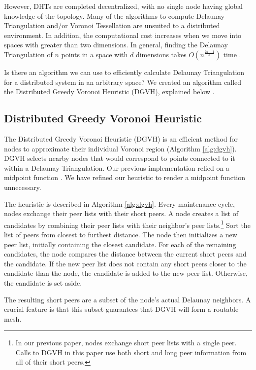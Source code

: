 \documentclass[11pt,conference]{IEEEtran}
\begin{document}
However, DHTs are completed decentralized, with no single node having global knowledge of the topology.
Many of the algorithms to compute Delaunay Triangulation and/or Voronoi Tessellation are unsuited to a distributed environment.
In addition, the computational cost increases when we move into spaces with greater than two dimensions.
In general, finding the Delaunay Triangulation of $n$ points in a space with $d$ dimensions takes $O(n^{\frac{2d-1}{d}})$ time \cite{watson1981computing}.


Is there an algorithm we can use to efficiently calculate Delaunay Triangulation for a distributed system in an arbitrary space?
We created an algorithm called the Distributed Greedy Voronoi Heuristic (DGVH), explained below \cite{dgvh}.


\subsection{Distributed Greedy Voronoi Heuristic}
\label{sec:dgvh}


The Distributed Greedy Voronoi Heuristic (DGVH) is an efficient method for nodes to approximate their individual Voronoi region (Algorithm \ref{alg:dgvh}). 
DGVH selects nearby nodes that would correspond to points connected to it within a Delaunay Triangulation.
Our previous implementation relied on a midpoint function \cite{dgvh}.
We have refined our heuristic to render a midpoint function unnecessary.

The heuristic is described in Algorithm \ref{alg:dgvh}.
Every maintenance cycle, nodes exchange their peer lists with their short peers.
A node creates a list of candidates by combining their peer lists with their neighbor's peer lists.\footnote{In our previous paper, nodes exchange short peer lists with a single peer. Calls to DGVH in this paper use both short and long peer information from all of their short peers.}
Sort the list of peers from closest to furthest distance.
The node then initializes a new peer list, initially containing the closest candidate.
For each of the remaining candidates, the node compares the distance between the current short peers and the candidate.
If the new peer list does not contain any short  peers closer to the candidate than the node, the candidate is added to the new peer list.
Otherwise, the candidate is set aside.

The resulting short peers are a subset of the node's actual Delaunay neighbors.
A crucial feature is that this subset guarantees that DGVH will form a routable mesh.
\end{document}
